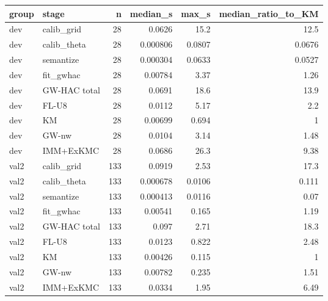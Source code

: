 \begin{tabular}{llrrrr}
\toprule
group & stage & n & median_s & max_s & median_ratio_to_KM \\
\midrule
dev & calib_grid & 28 & 0.0626 & 15.2 & 12.5 \\
dev & calib_theta & 28 & 0.000806 & 0.0807 & 0.0676 \\
dev & semantize & 28 & 0.000304 & 0.0633 & 0.0527 \\
dev & fit_gwhac & 28 & 0.00784 & 3.37 & 1.26 \\
dev & GW-HAC total & 28 & 0.0691 & 18.6 & 13.9 \\
dev & FL-U8 & 28 & 0.0112 & 5.17 & 2.2 \\
dev & KM & 28 & 0.00699 & 0.694 & 1 \\
dev & GW-nw & 28 & 0.0104 & 3.14 & 1.48 \\
dev & IMM+ExKMC & 28 & 0.0686 & 26.3 & 9.38 \\
val2 & calib_grid & 133 & 0.0919 & 2.53 & 17.3 \\
val2 & calib_theta & 133 & 0.000678 & 0.0106 & 0.111 \\
val2 & semantize & 133 & 0.000413 & 0.0116 & 0.07 \\
val2 & fit_gwhac & 133 & 0.00541 & 0.165 & 1.19 \\
val2 & GW-HAC total & 133 & 0.097 & 2.71 & 18.3 \\
val2 & FL-U8 & 133 & 0.0123 & 0.822 & 2.48 \\
val2 & KM & 133 & 0.00426 & 0.115 & 1 \\
val2 & GW-nw & 133 & 0.00782 & 0.235 & 1.51 \\
val2 & IMM+ExKMC & 133 & 0.0334 & 1.95 & 6.49 \\
\bottomrule
\end{tabular}
